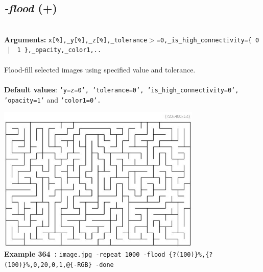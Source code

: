 \documentclass[a4paper,11pt,twoside]{book}
\begin{document}
\subsection{\emph{-flood} (+)}\vspace*{-0.5em}
~\\\textbf{Arguments: } 
{\small \texttt{x[\%],\_y[\%],\_z[\%],\_tolerance$>$=0,\_is\_high\_connectivity=\{ 0 ~$|$~ 1 \},\_opacity,\_color1,..}}\\~\\
Flood-fill selected images using specified value and tolerance.
~\\~\\\textbf{Default values}: {\small \texttt{'y=z=0', 'tolerance=0', 'is\_high\_connectivity=0', 'opacity=1'} and \texttt{'color1=0'.}}
\begin{center}\includegraphics[keepaspectratio=true,height=7cm,width=\textwidth]{img/gmic_def364.jpg}\\
{\footnotesize \textbf{Example 364~:} \texttt{image.jpg -repeat 1000 -flood \{?(100)\}\%,\{?(100)\}\%,0,20,0,1,@\{-RGB\} -done}}
\end{center}
\end{document}
